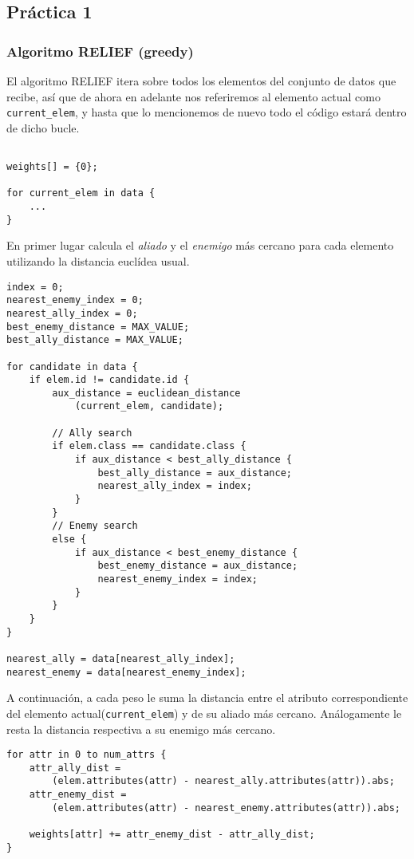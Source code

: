 \documentclass[size=a4, parskip=half, titlepage=false, toc=flat, toc=bib, 12pt]{scrartcl}
\begin{document}
\subsection{Práctica 1}
\subsubsection{Algoritmo RELIEF (greedy)}

El algoritmo RELIEF itera sobre todos los elementos del conjunto de datos que recibe, así que de ahora en adelante nos referiremos al elemento actual como \texttt{current\_elem}, y hasta que lo mencionemos de nuevo todo el código estará dentro de dicho bucle.
\begin{verbatim}

weights[] = {0};

for current_elem in data {
    ...
}
\end{verbatim}

En primer lugar calcula el \textit{aliado} y el \textit{enemigo} más cercano para cada elemento utilizando la distancia euclídea usual.
\begin{verbatim}
index = 0;
nearest_enemy_index = 0;
nearest_ally_index = 0;
best_enemy_distance = MAX_VALUE;
best_ally_distance = MAX_VALUE;

for candidate in data {
    if elem.id != candidate.id {
        aux_distance = euclidean_distance
            (current_elem, candidate);

        // Ally search
        if elem.class == candidate.class {
            if aux_distance < best_ally_distance {
                best_ally_distance = aux_distance;
                nearest_ally_index = index;
            }
        }
        // Enemy search
        else {
            if aux_distance < best_enemy_distance {
                best_enemy_distance = aux_distance;
                nearest_enemy_index = index;
            }
        }
    }
}

nearest_ally = data[nearest_ally_index];
nearest_enemy = data[nearest_enemy_index];
\end{verbatim}

A continuación, a cada peso le suma la distancia entre el atributo correspondiente del elemento actual(\texttt{current\_elem}) y de su aliado más cercano. Análogamente le resta la distancia respectiva a su enemigo más cercano.

\begin{verbatim}
for attr in 0 to num_attrs {
    attr_ally_dist =
        (elem.attributes(attr) - nearest_ally.attributes(attr)).abs;
    attr_enemy_dist =
        (elem.attributes(attr) - nearest_enemy.attributes(attr)).abs;

    weights[attr] += attr_enemy_dist - attr_ally_dist;
}
\end{verbatim}
\end{document}
